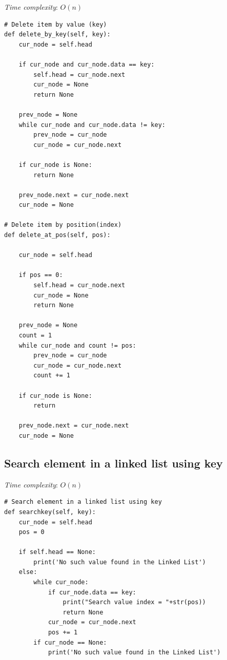 \documentclass[a4paper,11pt]{book}
\begin{document}
\noindent \textit{Time complexity}: $O(n)$

\begin{lstlisting}
# Delete item by value (key)
def delete_by_key(self, key):
    cur_node = self.head

    if cur_node and cur_node.data == key:
        self.head = cur_node.next
        cur_node = None
        return None

    prev_node = None 
    while cur_node and cur_node.data != key:
        prev_node = cur_node
        cur_node = cur_node.next

    if cur_node is None:
        return None

    prev_node.next = cur_node.next
    cur_node = None

# Delete item by position(index)
def delete_at_pos(self, pos):

    cur_node = self.head

    if pos == 0:
        self.head = cur_node.next
        cur_node = None
        return None

    prev_node = None
    count = 1
    while cur_node and count != pos:
        prev_node = cur_node 
        cur_node = cur_node.next
        count += 1

    if cur_node is None:
        return 

    prev_node.next = cur_node.next
    cur_node = None
\end{lstlisting}

\subsection{Search element in a linked list using key}
\vspace{5mm}

\noindent \textit{Time complexity}: $O(n)$

\begin{lstlisting}
# Search element in a linked list using key
def searchkey(self, key):
    cur_node = self.head
    pos = 0
    
    if self.head == None:
        print('No such value found in the Linked List')
    else:
        while cur_node:
            if cur_node.data == key:
                print("Search value index = "+str(pos))
                return None
            cur_node = cur_node.next
            pos += 1
        if cur_node == None:
            print('No such value found in the Linked List')
\end{lstlisting}
\end{document}

